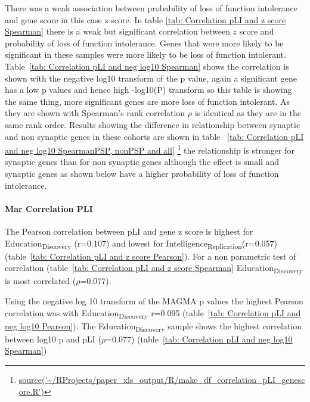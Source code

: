 There was a weak association between probability of loss of function intolerance and gene score in this case z score. In table \ref{tab: Correlation pLI and z score Spearman} there is a weak but significant correlation between $z$ score and probability of loss of function intolerance. Genes that were more likely to be significant in these samples were more likely to be loss of function intolerant. Table~\ref{tab: Correlation pLI and neg log10 Spearman} shows the correlation is shown with the negative log10 transform of the p value, again a significant gene has a low p values and hence high -log10(P) transform so this table is showing the same thing, more significant genes are more loss of function intolerant. As they are shown with Spearman's rank correlation $\rho$ is identical as they are in the same rank order. Results showing the difference in relationship between synaptic and non synaptic genes in these cohorts are shown in table ~\ref{tab: Correlation pLI and neg log10 SpearmanPSP, nonPSP and all}  \footnote{\url{source('~/RProjects/paper_xls_output/R/make_df_correlation_pLI_genescore.R')}} the relationship is stronger for synaptic genes than for non synaptic genes although the effect is small and synaptic genes as shown below have a higher probability of loss of function intolerance.



\paragraph{Mar Correlation PLI}
The Pearson correlation between pLI and gene z score is highest for Education\textsubscript{Discovery} (r=0.107) and lowest for Intelligence\textsubscript{Replication}(r=0.057) (table~\ref{tab: Correlation pLI and z score Pearson}). For a non parametric test of correlation (table~\ref{tab: Correlation pLI and z score Spearman} Education\textsubscript{Discovery} is most correlated ($\rho$=0.077).

Using the negative log 10 transform of the MAGMA p values the highest Pearson correlation was with Education\textsubscript{Discovery} r=0.095 (table~\ref{tab: Correlation pLI and neg log10 Pearson}). The Education\textsubscript{Discovery} sample shows the highest correlation between log10 p and pLI ($\rho$=0.077) (table~\ref{tab: Correlation pLI and neg log10 Spearman})






